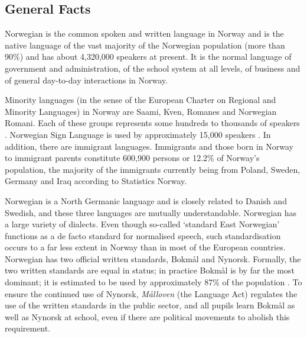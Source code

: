 \clearpage


\begin{multicols}{2}

\subsection{General Facts}

Norwegian is the common spoken and written language in Norway and is the native language of the vast majority of the Norwegian population (more than 90\%) and has about 4,320,000 speakers at present.
It is the normal language of government and administration, of the school system at all levels, of business and of general day-to-day interactions in Norway.


Minority languages (in the sense of the European Charter on Regional and Minority Languages) in Norway are Saami, Kven, Romanes and Norwegian Romani.
Each of these groups represents some hundreds to thousands of speakers \cite{stm35:2008}. 
Norwegian Sign Language is used by approximately 15,000 speakers \cite{Erl:2007}. 
In addition, there are immigrant languages.
Immigrants and those born in Norway to immigrant parents constitute 600,900 persons or 12.2\% of Norway’s population, the majority of the immigrants currently being from Poland, Sweden, Germany and Iraq according to Statistics Norway.

Norwegian is a North Germanic language and is closely related to Danish and Swedish, and these three languages are mutually understandable. 
Norwegian has a large variety of dialects. 
Even though so-called ‘standard East Norwegian’ functions as a de facto standard for normalised speech, such standardisation occurs to a far less extent in Norway than in most of the European countries.
Norwegian has two official written standards, Bokmål and Nynorsk. 
Formally, the two written standards are equal in status; in practice Bokmål is by far the most dominant; it is estimated to be used by approximately 87\% of the population \cite{stm35:2008}.
To ensure the continued use of Nynorsk, \textit{Målloven} (the Language Act) regulates the use of the written standards in the public sector, and all pupils learn Bokmål as well as Nynorsk at school, even if there are political movements to abolish this requirement.


\end{multicols}
